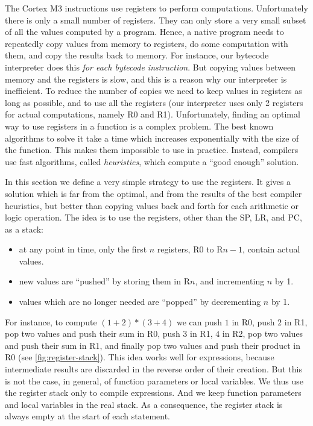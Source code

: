 The Cortex M3 instructions use registers to perform computations. Unfortunately
there is only a small number of registers. They can only store a very small
subset of all the values computed by a program. Hence, a native program needs
to repeatedly copy values from memory to registers, do some computation with
them, and copy the results back to memory. For instance, our bytecode
interpreter does this {\em for each bytecode instruction}. But copying values
between memory and the registers is slow, and this is a reason why our
interpreter is inefficient. To reduce the number of copies we need to keep
values in registers as long as possible, and to use all the registers (our
interpreter uses only 2 registers for actual computations, namely R0 and R1).
Unfortunately, finding an optimal way to use registers in a function is a
complex problem. The best known algorithms to solve it take a time which
increases exponentially with the size of the function. This makes them
impossible to use in practice. Instead, compilers use fast algorithms, called
{\em heuristics}, which compute a ``good enough'' solution.

In this section we define a very simple strategy to use the registers. It gives
a solution which is far from the optimal, and from the results of the best
compiler heuristics, but better than copying values back and forth for each
arithmetic or logic operation. The idea is to use the registers, other than the
SP, LR, and PC, as a stack:
\begin{itemize}
  \item at any point in time, only the first $n$ registers, R0 to R$n-1$,
  contain actual values.

  \item new values are ``pushed'' by storing them in R$n$, and incrementing $n$
  by 1.

  \item values which are no longer needed are ``popped'' by decrementing $n$ by
  1.
\end{itemize}

For instance, to compute $(1+2)*(3+4)$ we can push $1$ in R0, push $2$ in R1,
pop two values and push their sum in R0, push $3$ in R1, $4$ in R2, pop two
values and push their sum in R1, and finally pop two values and push their
product in R0 (see \cref{fig:register-stack}). This idea works well for
expressions, because intermediate results are discarded in the reverse order of
their creation. But this is not the case, in general, of function parameters or
local variables. We thus use the register stack only to compile expressions.
And we keep function parameters and local variables in the real stack. As a
consequence, the register stack is always empty at the start of each statement.

